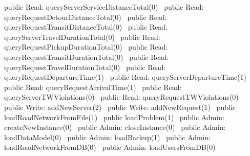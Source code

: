 public \LA{}Read: queryServerServiceDistanceTotal(0)~{\nwtagstyle{}}\RA{}
public \LA{}Read: queryRequestDetourDistanceTotal(0)~{\nwtagstyle{}}\RA{}
public \LA{}Read: queryRequestTransitDistanceTotal(0)~{\nwtagstyle{}}\RA{}
public \LA{}Read: queryServerTravelDurationTotal(0)~{\nwtagstyle{}}\RA{}
public \LA{}Read: queryRequestPickupDurationTotal(0)~{\nwtagstyle{}}\RA{}
public \LA{}Read: queryRequestTransitDurationTotal(0)~{\nwtagstyle{}}\RA{}
public \LA{}Read: queryRequestTravelDurationTotal(0)~{\nwtagstyle{}}\RA{}
public \LA{}Read: queryRequestDepartureTime(1)~{\nwtagstyle{}}\RA{}
public \LA{}Read: queryServerDepartureTime(1)~{\nwtagstyle{}}\RA{}
public \LA{}Read: queryRequestArrivalTime(1)~{\nwtagstyle{}}\RA{}
public \LA{}Read: queryServerTWViolations(0)~{\nwtagstyle{}}\RA{}
public \LA{}Read: queryRequestTWViolations(0)~{\nwtagstyle{}}\RA{}
\nwendcode{}\nwdocspar
{}
\nwenddocs{}\plusendmoddef
public \LA{}Write: addNewServer(2)~{\nwtagstyle{}}\RA{}
public \LA{}Write: addNewRequest(1)~{\nwtagstyle{}}\RA{}
public \LA{}loadRoadNetworkFromFile(1)~{\nwtagstyle{}}\RA{}
public \LA{}loadProblem(1)~{\nwtagstyle{}}\RA{}
\nwendcode{}\nwdocspar
{}
\nwenddocs{}\plusendmoddef
public \LA{}Admin: createNewInstance(0)~{\nwtagstyle{}}\RA{}
public \LA{}Admin: closeInstance(0)~{\nwtagstyle{}}\RA{}
public \LA{}Admin: loadDataModel(0)~{\nwtagstyle{}}\RA{}
public \LA{}Admin: loadBackup(1)~{\nwtagstyle{}}\RA{}
public \LA{}Admin: loadRoadNetworkFromDB(0)~{\nwtagstyle{}}\RA{}
public \LA{}Admin: loadUsersFromDB(0)~{\nwtagstyle{}}\RA{}

